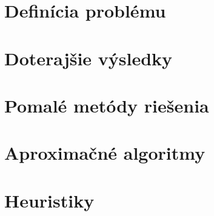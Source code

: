 \documentclass[12pt,a4paper]{book}
\begin{document}
\chapter{Definícia problému}
\label{chapter:definition}


\chapter{Doterajšie výsledky}
\label{chapter:previous}


\chapter{Pomalé metódy riešenia}
\label{chapter:slow}


\chapter{Aproximačné algoritmy}
\label{chapter:ptas}


\chapter{Heuristiky}
\label{chapter:heuristiky}


%
%
%
%
%
%
%
%
%
%
%
%
%
%
%
%
%
%
\end{document}
